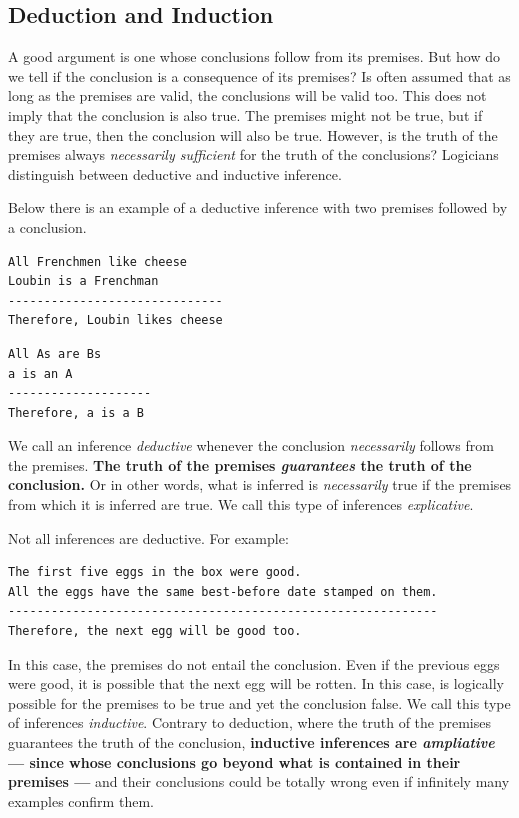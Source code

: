 \documentclass[
]{book}
\begin{document}
\hypertarget{deduction}{%
\subsection{Deduction and Induction}\label{deduction}}

A good argument is one whose conclusions follow from its premises. But how do we tell if the conclusion is a consequence of its premises? Is often assumed that as long as the premises are valid, the conclusions will be valid too. This does not imply that the conclusion is also true. The premises might not be true, but if they are true, then the conclusion will also be true. However, is the truth of the premises always \emph{necessarily sufficient} for the truth of the conclusions? Logicians distinguish between deductive and inductive inference. \citep{sep-abduction}

Below there is an example of a deductive inference with two premises followed by a conclusion.

\begin{verbatim}
All Frenchmen like cheese
Loubin is a Frenchman
------------------------------
Therefore, Loubin likes cheese
\end{verbatim}

\begin{verbatim}
All As are Bs
a is an A
--------------------
Therefore, a is a B
\end{verbatim}

We call an inference \emph{deductive} whenever the conclusion \emph{necessarily} follows from the premises. \textbf{The truth of the premises \emph{guarantees} the truth of the conclusion.} Or in other words, what is inferred is \emph{necessarily} true if the premises from which it is inferred are true. We call this type of inferences \emph{explicative}.

Not all inferences are deductive. For example:

\begin{verbatim}
The first five eggs in the box were good.
All the eggs have the same best-before date stamped on them.
------------------------------------------------------------
Therefore, the next egg will be good too.
\end{verbatim}

In this case, the premises do not entail the conclusion. Even if the previous eggs were good, it is possible that the next egg will be rotten. In this case, is logically possible for the premises to be true and yet the conclusion false. We call this type of inferences \emph{inductive}. Contrary to deduction, where the truth of the premises guarantees the truth of the conclusion, \textbf{inductive inferences are \emph{ampliative} --- since whose conclusions go beyond what is contained in their premises ---} and their conclusions could be totally wrong even if infinitely many examples confirm them. \citep{bergadano1991problem}
\end{document}
